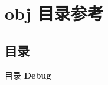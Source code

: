\section{obj 目录参考}
\label{dir_43724e81dd40e09f32417973865cdd64}
\subsection*{目录}
\begin{DoxyCompactItemize}
\item 
目录 \textbf{ Debug}
\end{DoxyCompactItemize}
